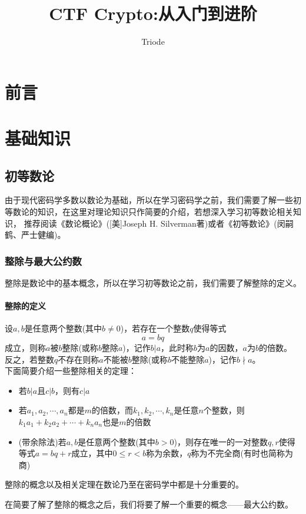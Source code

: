 \documentclass{article}
\numberwithin{equation}{subsubsection}
\begin{document}
\title{CTF Crypto:从入门到进阶}
\author{Triode}
\date{}
\maketitle

\tableofcontents
\newpage
{}

\section{前言}
\newpage

\section{基础知识}
\subsection{初等数论}
由于现代密码学多数以数论为基础，所以在学习密码学之前，我们需要了解一些初等数论的知识，在这里对理论知识只作简要的介绍，若想深入学习初等数论相关知识，
推荐阅读《数论概论》([美]Joseph H. Silverman著)或者《初等数论》(闵嗣鹤、严士健编)。
\subsubsection{整除与最大公约数}
整除是数论中的基本概念，所以在学习初等数论之前，我们需要了解整除的定义。
\paragraph{\textbf{整除的定义}}
设$a,b$是任意两个整数(其中$b\neq 0$)，若存在一个整数$q$使得等式
\begin{equation}
    a = bq
    \nonumber
\end{equation}
成立，则称$a$被$b$整除(或称$b$整除$a$)，记作$b|a$，此时称$b$为$a$的因数，$a$为$b$的倍数。
反之，若整数$q$不存在则称$a$不能被$b$整除(或称$b$不能整除$a$)，记作$b\nmid a$。\\
下面简要介绍一些整除相关的定理：
\begin{itemize}
    \item 若$b|a$且$c|b$，则有$c|a$
    \item 若$a_1, a_2,\cdots,a_n$都是$m$的倍数，而$k_1,k_2,\cdots,k_n$是任意$n$个整数，则$k_1a_1+k_2a_2+\cdots+k_na_n$也是$m$的倍数
    \item (带余除法)若$a,b$是任意两个整数(其中$b>0$)，则存在唯一的一对整数$q,r$使得等式$a=bq+r$成立，其中$0\leq r < b$称为余数，$q$称为不完全商(有时也简称为商)
\end{itemize}
整除的概念以及相关定理在数论乃至在密码学中都是十分重要的。\par
在简要了解了整除的概念之后，我们将要了解一个重要的概念——最大公约数。
\end{document}

